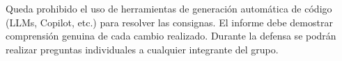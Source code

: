 \documentclass[12pt,a4paper]{article}
\begin{document}
\begin{atencion}
Queda prohibido el uso de herramientas de generación automática de código
(LLMs, Copilot, etc.) para resolver las consignas. El informe debe demostrar
comprensión genuina de cada cambio realizado. Durante la defensa se podrán
realizar preguntas individuales a cualquier integrante del grupo.
\end{atencion}
\end{document}
